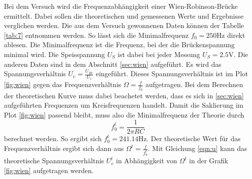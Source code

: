 Bei dem Versuch wird die Frequenzabhängigkeit einer Wien-Robinson-Brücke ermittelt. Dabei sollen die theoretischen und gemessenen Werte und Ergebnisse verglichen werden.
Die aus dem Versuch gewonnenen Daten können der Tabelle \ref{tab:7} entnommen werden. So lässt sich die Minimalfrequenz
$f_0=250\si{\hertz}$ direkt ablesen. Die Minimalfrequenz ist die Frequenz, bei der die Brückenspannung minimal wird. Die Speisspannung 
$U_S$ ist dabei bei jeder Messung $U_S=2.5 \si{\volt}$. Die anderen Daten sind in dem Abschnitt \ref{sec:wien} aufgeführt.
Es wird das Spannungsverhältnis $U_v=\frac{U_{Br}}{U_s}$ eingeführt. Dieses Spannungsverhältnis ist im Plot \ref{fig:wien}
gegen das Frequenzverhältnis $\Omega=\frac{f}{f_0}$ aufgetragen. Bei dem Berechnen der theoretischen Kurve muss dabei beachetet werden,
dass es sich in \ref{sec:wien} aufgeführten Frequenzen um Kreisfrequenzen handelt. Damit die Saklierung im Plot \ref{fig:wien} passend bleibt,
muss also die Minimalfrequenz der Theorie durch 
\begin{equation}
    f_{0}^{t}=\frac{1}{2\pi RC}
\end{equation} 
berechnet werden. So ergibt sich $f_{0}^{t}=241.14\si{\hertz}$. Der theoretische Wert für das Frequenzverhältnis ergibt sich dann aus $\Omega^{t}=\frac{f}{f_{0}^{t}}$.
Mit Gleichung \eqref{eqn:u} kann das theoretische Spannungsverhältnis $U_{v}^{t}$ in Abhängigkeit von $\Omega^{t}$ in der Grafik
\ref{fig:wien} aufgetragen werden.



%
